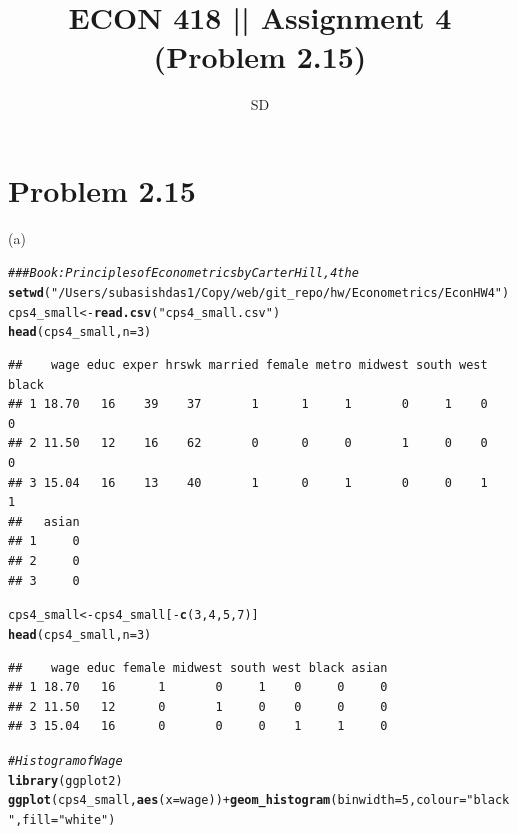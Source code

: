 \documentclass[a4paper]{article}\usepackage[]{graphicx}\usepackage[]{color}
\makeatletter
\newcommand{\hlnum}[1]{\textcolor[rgb]{0.686,0.059,0.569}{#1}}%
\newcommand{\hlstr}[1]{\textcolor[rgb]{0.192,0.494,0.8}{#1}}%
\newcommand{\hlcom}[1]{\textcolor[rgb]{0.678,0.584,0.686}{\textit{#1}}}%
\newcommand{\hlopt}[1]{\textcolor[rgb]{0,0,0}{#1}}%
\newcommand{\hlstd}[1]{\textcolor[rgb]{0.345,0.345,0.345}{#1}}%
\newcommand{\hlkwb}[1]{\textcolor[rgb]{0.69,0.353,0.396}{#1}}%
\newcommand{\hlkwc}[1]{\textcolor[rgb]{0.333,0.667,0.333}{#1}}%
\newcommand{\hlkwd}[1]{\textcolor[rgb]{0.737,0.353,0.396}{\textbf{#1}}}%
\newenvironment{kframe}{%
 \def\at@end@of@kframe{}%
 \ifinner\ifhmode%
  \def\at@end@of@kframe{\end{minipage}}%
  \begin{minipage}{\columnwidth}%
 \fi\fi%
 \def\FrameCommand##1{\hskip\@totalleftmargin \hskip-\fboxsep
 \colorbox{shadecolor}{##1}\hskip-\fboxsep
     \hskip-\linewidth \hskip-\@totalleftmargin \hskip\columnwidth}%
 \MakeFramed {\advance\hsize-\width
   \@totalleftmargin\z@ \linewidth\hsize
   \@setminipage}}%
 {\par\unskip\endMakeFramed%
 \at@end@of@kframe}
\newenvironment{knitrout}{}{} %
\makeatother
\begin{document}
\title{ECON 418 || Assignment 4 (Problem 2.15)}
\author{SD}
\maketitle

\section{ Problem 2.15}

(a)

\begin{knitrout}
\color{fgcolor}\begin{kframe}
\begin{alltt}
\hlcom{### Book: Principles of Econometrics by Carter Hill, 4th e}
\hlkwd{setwd}\hlstd{(}\hlstr{"/Users/subasishdas1/Copy/web/git_repo/hw/Econometrics/Econ HW 4"}\hlstd{)}
\hlstd{cps4_small} \hlkwb{<-} \hlkwd{read.csv}\hlstd{(}\hlstr{"cps4_small.csv"}\hlstd{)}
\hlkwd{head}\hlstd{(cps4_small,}\hlkwc{n}\hlstd{=}\hlnum{3}\hlstd{)}
\end{alltt}
\begin{verbatim}
##    wage educ exper hrswk married female metro midwest south west black
## 1 18.70   16    39    37       1      1     1       0     1    0     0
## 2 11.50   12    16    62       0      0     0       1     0    0     0
## 3 15.04   16    13    40       1      0     1       0     0    1     1
##   asian
## 1     0
## 2     0
## 3     0
\end{verbatim}
\begin{alltt}
\hlstd{cps4_small} \hlkwb{<-} \hlstd{cps4_small[}\hlopt{-}\hlkwd{c}\hlstd{(}\hlnum{3}\hlstd{,}\hlnum{4}\hlstd{,}\hlnum{5}\hlstd{,}\hlnum{7}\hlstd{)]}
\hlkwd{head}\hlstd{(cps4_small,}\hlkwc{n}\hlstd{=}\hlnum{3}\hlstd{)}
\end{alltt}
\begin{verbatim}
##    wage educ female midwest south west black asian
## 1 18.70   16      1       0     1    0     0     0
## 2 11.50   12      0       1     0    0     0     0
## 3 15.04   16      0       0     0    1     1     0
\end{verbatim}
\begin{alltt}
\hlcom{# Histogram of Wage}
\hlkwd{library}\hlstd{(ggplot2)}
\hlkwd{ggplot}\hlstd{(cps4_small,} \hlkwd{aes}\hlstd{(}\hlkwc{x}\hlstd{=wage))} \hlopt{+} \hlkwd{geom_histogram}\hlstd{(}\hlkwc{binwidth}\hlstd{=}\hlnum{5}\hlstd{,} \hlkwc{colour}\hlstd{=}\hlstr{"black"}\hlstd{,} \hlkwc{fill}\hlstd{=}\hlstr{"white"}\hlstd{)}

\end{alltt}
\end{kframe}
\end{knitrout}
\end{document}
